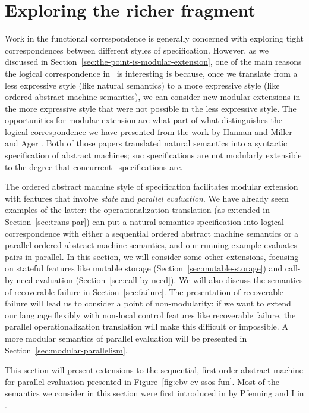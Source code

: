 \section{Exploring the richer fragment}
\label{sec:richer-ordered-abstract}

Work in the functional correspondence is generally concerned with
exploring tight correspondences between different styles of
specification. However, as we discussed in
Section~\ref{sec:the-point-is-modular-extension}, one of the main
reasons the logical correspondence in \sls~is interesting is because,
once we translate from a less expressive style (like natural
semantics) to a more expressive style (like ordered abstract machine
semantics), we can consider new modular extensions in the more
expressive style that were not possible in the less expressive
style. The opportunities for modular extension are what part of what
distinguishes the logical correspondence we have presented from the
work by Hannan and Miller \cite{hannan92operational} and Ager
\cite{ager04natural}. Both of those papers translated natural
semantics into a syntactic specification of abstract machines; suc
specifications are not modularly extensible to the degree that
concurrent \sls~specifications are.

The ordered abstract machine style of specification facilitates
modular extension with features that involve {\it state} and {\it
  parallel evaluation}. We have already seem examples of the latter:
the operationalization translation (as extended in
Section~\ref{sec:trans-par}) can put a natural semantics specification
into logical correspondence with either a sequential ordered abstract
machine semantics or a parallel ordered abstract machine semantics,
and our running example evaluates pairs in parallel. In this section,
we will consider some other extensions, focusing on stateful features
like mutable storage (Section~\ref{sec:mutable-storage}) and
call-by-need evaluation (Section~\ref{sec:call-by-need}). We will also
discuss the semantics of recoverable failure in
Section~\ref{sec:failure}. The presentation of recoverable failure
will lead us to consider a point of non-modularity: if we want to
extend our language flexibly with non-local control features like
recoverable failure, the parallel operationalization translation will
make this difficult or impossible.  A more modular semantics of
parallel evaluation will be presented in
Section~\ref{sec:modular-parallelism}.

This section will present extensions to the sequential, first-order
abstract machine for parallel evaluation presented in
Figure~\ref{fig:cbv-ev-ssos-fun}. Most of the semantics we consider in
this section were first introduced in by Pfenning and I in
\cite{pfenning09substructural}.

